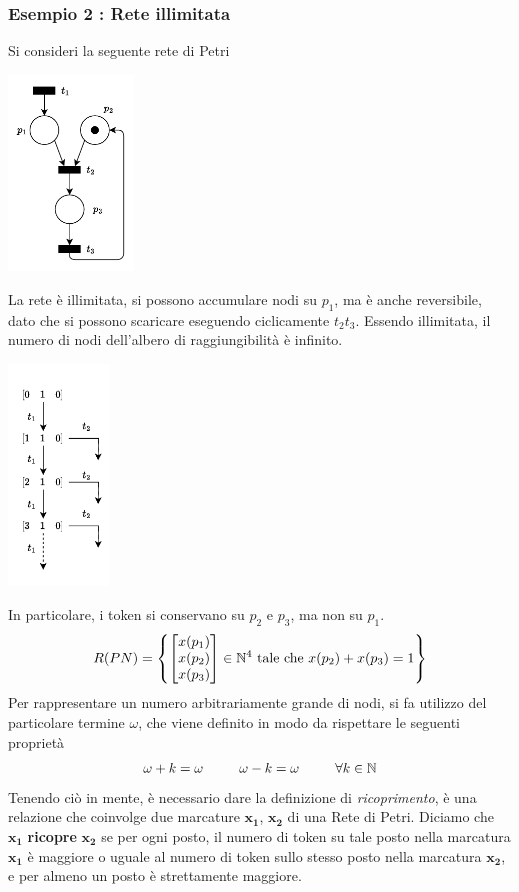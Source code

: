 \documentclass[10pt, letterpaper]{report}
\begin{document}
\subsubsection{Esempio 2 : Rete illimitata}
Si consideri la seguente rete di Petri
\begin{center}
    \includegraphics[width=0.25\textwidth]{images/AlberoIll.drawio.pdf}
\end{center}
La rete è illimitata, si possono accumulare nodi su $p_1$,  ma è anche reversibile, dato che si possono scaricare eseguendo ciclicamente $t_2t_3$. Essendo illimitata, il numero di nodi dell'albero di raggiungibilità è infinito.
\begin{center}
    \includegraphics[width=0.2\textwidth]{images/alberoIll2.drawio.pdf}
\end{center}
In particolare, i token si conservano su $p_2$ e $p_3$, ma non su $p_1$. 
$$ R(PN)= \left\{   \begin{bmatrix}x(p_1)\\x(p_2)\\x(p_3) \end{bmatrix} \in {\mathbb N}^4 \text{ tale che }x(p_2)+x(p_3)=1  \right\}$$
Per rappresentare un numero arbitrariamente grande di nodi, si fa utilizzo del particolare termine $\omega$, che viene definito in modo da rispettare le seguenti proprietà 
$$ \omega+k=\omega \ \ \ \ \ \ \ \ \omega-k=\omega \ \ \ \ \ \ \ \ \forall k \in \N$$
Tenendo ciò in mente, è necessario dare la definizione di \textit{ricoprimento}, è una relazione che coinvolge due marcature $\mathbf{x_1}$, $\mathbf{x_2}$ di una Rete di Petri. Diciamo che $\mathbf{x_1}$ \textbf{ricopre} $\mathbf{x_2}$ se per ogni posto, il numero di token su tale posto nella marcatura $\mathbf{x_1}$ è maggiore o uguale al numero di token sullo stesso posto nella marcatura $\mathbf{x_2}$, e per almeno un posto è strettamente maggiore. 
\end{document}
